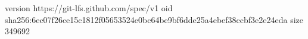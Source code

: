 version https://git-lfs.github.com/spec/v1
oid sha256:6ec07f26ce15c1812f05653524e0bc64be9bf6dde25a4ebef38ccbf3e2e24eda
size 349692
